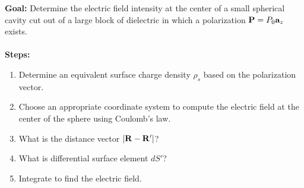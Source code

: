 \documentclass[../../header.tex]{subfiles}
\begin{document}
\textbf{Goal:} Determine the electric field intensity at the center of a small spherical cavity cut out of a large block of dielectric in which a polarization $\mathbf{P} = P_0 \mathbf{a}_z$ exists. \\
\\
\textbf{Steps:} 
\begin{enumerate}
\item Determine an equivalent surface charge density $\rho_s$ based on the polarization vector. 


\item Choose an appropriate coordinate system to compute the electric field at the center of the sphere using Coulomb's law.


\item What is the distance vector $\left|\mathbf{R} - \mathbf{R}'\right|$?


\item What is differential surface element $dS'$?


\item Integrate to find the electric field.


\end{enumerate}
\end{document}
